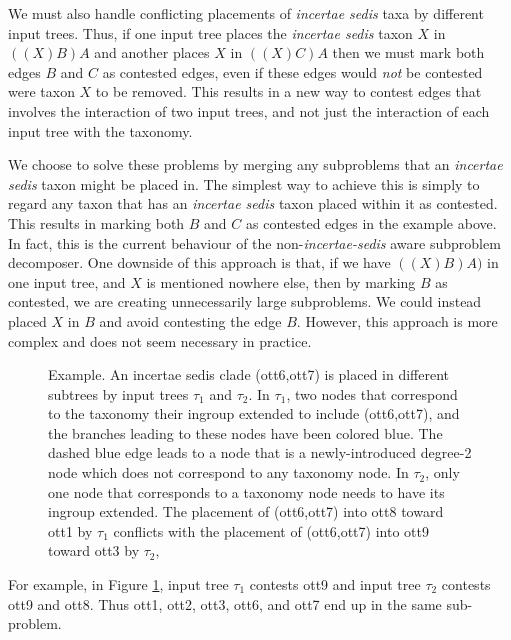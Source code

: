 \documentclass[english]{article}
\newcommand{\lyxdot}{.}
\begin{document}
We must also handle conflicting placements of \emph{incertae sedis}
taxa by different input trees.
Thus, if one input tree places the
\emph{incertae sedis} taxon $X$ in $((X)B)A$ and another places $X$ in
$((X)C)A$ then we must mark both edges $B$ and $C$ as contested edges,
even if these edges would \emph{not} be contested were taxon $X$ to be
removed.
This results in a new way to contest edges that involves the
interaction of two input trees, and not just the interaction of each
input tree with the taxonomy.

We choose to solve these problems by merging any subproblems that an
\emph{incertae sedis} taxon might be placed in.
The simplest way to
achieve this is simply to regard any taxon that has an \emph{incertae
sedis }taxon placed within it as contested.
This results in marking
both $B$ and $C$ as contested edges in the example above.
In fact,
this is the current behaviour of the non-\emph{incertae-sedis} aware
subproblem decomposer.
One downside of this approach is that, if we
have $((X)B)A)$ in one input tree, and $X$ is mentioned nowhere else,
then by marking $B$ as contested, we are creating unnecessarily large
subproblems.
We could instead placed $X$ in $B$ and avoid contesting
the edge $B$.
However, this approach is more complex and does not seem
necessary in practice.

\begin{figure}

\caption{\label{fig:placement-example1}Example.
An incertae sedis clade (ott6,ott7)
is placed in different subtrees by input trees $\tau_{1}$ and $\tau_{2}$.
In $\tau_{1}$, two nodes that correspond to the taxonomy their ingroup
extended to include (ott6,ott7), and the branches leading to these
nodes have been colored blue.
The dashed blue edge leads to a node
that is a newly-introduced degree-2 node which does not correspond
to any taxonomy node.
In $\tau_{2}$, only one node that corresponds
to a taxonomy node needs to have its ingroup extended.
The placement
of (ott6,ott7) into ott8 toward ott1 by $\tau_{1}$ conflicts with
the placement of (ott6,ott7) into ott9 toward ott3 by $\tau_{2},$}
\end{figure}
 For example, in Figure
\ref{fig:placement-example1}, input tree $\tau_{1}$ contests ott9 and
input tree $\tau_{2}$ contests ott9 and ott8.
Thus ott1, ott2, ott3,
ott6, and ott7 end up in the same sub-problem.
\end{document}
